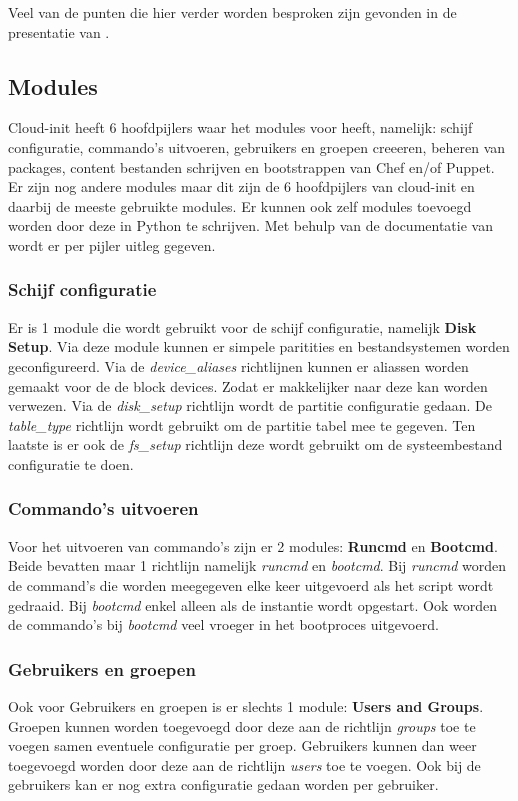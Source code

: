 Veel van de punten die hier verder worden besproken zijn gevonden in de presentatie van \autocite{cloudred}.

\subsection{Modules}
Cloud-init heeft 6 hoofdpijlers waar het modules voor heeft, namelijk: schijf configuratie, commando's uitvoeren, gebruikers en groepen creeeren, beheren van packages, content bestanden schrijven en bootstrappen van Chef en/of Puppet. Er zijn nog andere modules maar dit zijn de 6 hoofdpijlers van cloud-init en daarbij de meeste gebruikte modules. Er kunnen ook zelf modules toevoegd worden door deze in Python te schrijven. Met behulp van de documentatie van \textcite{clouddocs} wordt er per pijler uitleg gegeven. 

\subsubsection{Schijf configuratie}
Er is 1 module die wordt gebruikt voor de schijf configuratie, namelijk \textbf{Disk Setup}. Via deze module kunnen er simpele paritities en bestandsystemen worden geconfigureerd. Via de \textit{device\_aliases} richtlijnen kunnen er aliassen worden gemaakt voor de de block devices. Zodat er makkelijker naar deze kan worden verwezen. Via de \textit{disk\_setup} richtlijn wordt de partitie configuratie gedaan. De \textit{table\_type} richtlijn wordt gebruikt om de partitie tabel mee te gegeven. Ten laatste is er ook de \textit{fs\_setup} richtlijn deze wordt gebruikt om de systeembestand configuratie te doen.

\subsubsection{Commando's uitvoeren}
Voor het uitvoeren van commando's zijn er 2 modules: \textbf{Runcmd} en \textbf{Bootcmd}. Beide bevatten maar 1 richtlijn namelijk \textit{runcmd} en \textit{bootcmd}. Bij \textit{runcmd} worden de command's die worden meegegeven elke keer uitgevoerd als het script wordt gedraaid. Bij \textit{bootcmd} enkel alleen als de instantie wordt opgestart. Ook worden de commando's bij \textit{bootcmd} veel vroeger in het bootproces uitgevoerd.

\subsubsection{Gebruikers en groepen}
Ook voor Gebruikers en groepen is er slechts 1 module: \textbf{Users and Groups}. Groepen kunnen worden toegevoegd door deze aan de richtlijn \textit{groups} toe te voegen samen eventuele configuratie per groep. Gebruikers kunnen dan weer toegevoegd worden door deze aan de richtlijn \textit{users} toe te voegen. Ook bij de gebruikers kan er nog extra configuratie gedaan worden per gebruiker.

